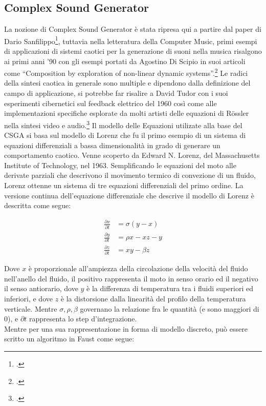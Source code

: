 \subsection{Complex Sound Generator}
\label{Complex Sound Generators}

La nozione di Complex Sound Generator è stata ripresa qui a partire dal
paper di Dario Sanfilippo\footcite{sanfilippo_constrained_2021},
tuttavia nella letteratura della Computer Music, primi esempi di applicazioni
di sistemi caotici per la generazione di suoni nella musica risalgono
ai primi anni '90 con gli esempi portati da Agostino Di Scipio
in suoi articoli come “Composition by exploration of non-linear dynamic systems”.\footcite{discipioiterated}
Le radici della sintesi caotica in generale sono multiple e dipendono
dalla definizione del campo di applicazione, si potrebbe far risalire
a David Tudor con i suoi esperimenti cibernetici sul feedback elettrico del 1960
così come alle implementazioni specifiche esplorate da molti artisti
delle equazioni di Rössler nella sintesi video e audio.\footcite{tom_mudd_gutter_synthesis}
Il modello delle Equazioni utilizate alla base del CSGA si basa sul modello di Lorenz 
che fu il primo esempio di un sistema di equazioni differenziali a bassa
dimensionalità in grado di generare un comportamento caotico.
Venne scoperto da Edward N. Lorenz, del Massachusetts Institute of Technology, nel 1963.
Semplificando le equazioni del moto alle derivate parziali che descrivono il movimento termico di
convezione di un fluido, Lorenz ottenne un sistema di tre equazioni differenziali del primo ordine.
La versione continua dell’equazione differenziale che descrive il modello di Lorenz è descritta come segue: 

\begin{align*}
\frac{\partial x}{\partial t} & = \sigma(y-x) \\
\frac{\partial y}{\partial t} & = \rho x - xz - y \\
\frac{\partial z}{\partial t} & = xy -\beta z 
\end{align*}

Dove \( x \) è proporzionale all’ampiezza della circolazione della velocità del fluido nell’anello del fluido,
il positivo rappresenta il moto in senso orario ed il negativo il senso antiorario,
dove \( y \) è la differenza di temperatura tra i fluidi superiori ed inferiori,
e dove \( z \) è la distorsione dalla linearità del profilo della temperatura verticale.
Mentre \( \sigma,  \rho,  \beta \) governano la relazione fra le quantità (e sono maggiori di 0),
e \( \partial t \) rappresenta lo step d'integrazione. \\
Mentre per una sua rappresentazione in forma di modello discreto,
può essere scritto un algoritmo in Faust come segue:

